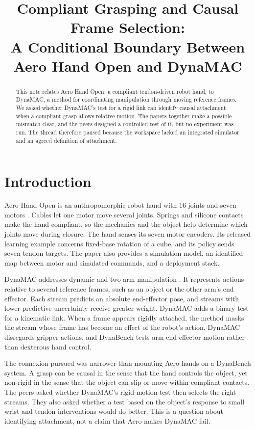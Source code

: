 \documentclass{article}
\title{Compliant Grasping and Causal Frame Selection:\\A Conditional Boundary Between Aero Hand Open and DynaMAC}
\author{}
\date{}
\begin{document}
\maketitle

\begin{abstract}
This note relates Aero Hand Open, a compliant tendon-driven robot hand, to DynaMAC, a method for coordinating manipulation through moving reference frames. We asked whether DynaMAC's test for a rigid link can identify causal attachment when a compliant grasp allows relative motion. The papers together make a possible mismatch clear, and the peers designed a controlled test of it, but no experiment was run. The thread therefore paused because the workspace lacked an integrated simulator and an agreed definition of attachment.
\end{abstract}

\section{Introduction}

Aero Hand Open is an anthropomorphic robot hand with 16 joints and seven motors \cite{wang2026aero}. Cables let one motor move several joints. Springs and silicone contacts make the hand compliant, so the mechanics and the object help determine which joints move during closure. The hand senses its seven motor encoders. Its released learning example concerns fixed-base rotation of a cube, and its policy sends seven tendon targets. The paper also provides a simulation model, an identified map between motor and simulated commands, and a deployment stack.

DynaMAC addresses dynamic and two-arm manipulation \cite{hartz2026dynamac}. It represents actions relative to several reference frames, such as an object or the other arm's end effector. Each stream predicts an absolute end-effector pose, and streams with lower predictive uncertainty receive greater weight. DynaMAC adds a binary test for a kinematic link. When a frame appears rigidly attached, the method masks the stream whose frame has become an effect of the robot's action. DynaMAC disregards gripper actions, and DynaBench tests arm end-effector motion rather than dexterous hand control.

The connexion pursued was narrower than mounting Aero hands on a DynaBench system. A grasp can be causal in the sense that the hand controls the object, yet non-rigid in the sense that the object can slip or move within compliant contacts. The peers asked whether DynaMAC's rigid-motion test then selects the right streams. They also asked whether a test based on the object's response to small wrist and tendon interventions would do better. This is a question about identifying attachment, not a claim that Aero makes DynaMAC fail.
\end{document}
